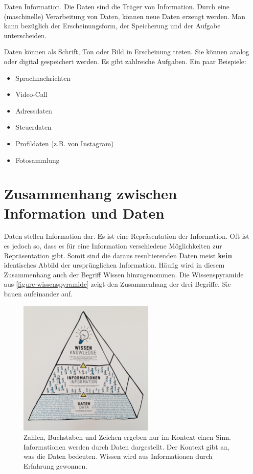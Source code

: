 \begin{definition}[Daten]
Daten  Information. Die Daten sind die Träger von Information. Durch eine (maschinelle) Verarbeitung von Daten, können neue Daten erzeugt werden. Man kann bezüglich der Erscheinungsform, der Speicherung und der Aufgabe unterscheiden.
\end{definition}

\begin{example}
Daten können als Schrift, Ton oder Bild in Erscheinung treten. Sie können analog oder digital gespeichert werden. Es gibt zahlreiche Aufgaben. Ein paar Beispiele:

\begin{multicols}{2}
\begin{itemize}
\item Sprachnachrichten
\item Video-Call
\item Adressdaten
\item Steuerdaten
\item Profildaten (z.B. von Instagram)
\item Fotosammlung
\end{itemize}
\end{multicols}

\end{example}

\section{Zusammenhang zwischen Information und Daten}

Daten stellen Information dar. Es ist eine Repräsentation der Information. Oft ist es jedoch so, dass es für eine Information verschiedene Möglichkeiten zur Repräsentation gibt. Somit sind die daraus resultierenden Daten meist \textbf{kein} identisches Abbild der ursprünglichen Information. Häufig wird in diesem Zusammenhang auch der Begriff Wissen hinzugenommen. Die Wissenspyramide aus \autoref{figure-wissenspyramide} zeigt den Zusammenhang der drei Begriffe. Sie bauen aufeinander auf.

\begin{figure}[htb]
\centering
\includegraphics[height=6.75cm]{wissenspyramide.jpeg}
\caption{Zahlen, Buchstaben und Zeichen ergeben nur im Kontext einen Sinn. Informationen werden durch Daten dargestellt. Der Kontext gibt an, was die Daten bedeuten. Wissen wird aus Informationen durch Erfahrung gewonnen.}
\label{figure-wissenspyramide}
\end{figure}

